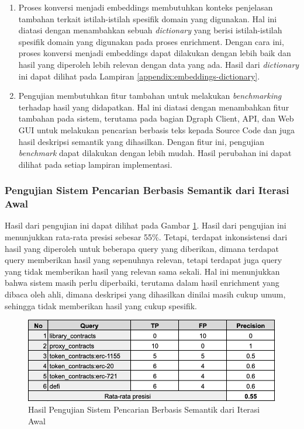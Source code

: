 \begin{enumerate}
	\item Proses konversi menjadi embeddings membutuhkan konteks penjelasan tambahan terkait istilah-istilah spesifik domain yang digunakan. Hal ini diatasi dengan menambahkan sebuah \textit{dictionary} yang berisi istilah-istilah spesifik domain yang digunakan pada proses enrichment. Dengan cara ini, proses konversi menjadi embeddings dapat dilakukan dengan lebih baik dan hasil yang diperoleh lebih relevan dengan data yang ada. Hasil dari \textit{dictionary} ini dapat dilihat pada Lampiran \ref{appendix:embeddings-dictionary}.
	\item Pengujian membutuhkan fitur tambahan untuk melakukan \textit{benchmarking} terhadap hasil yang didapatkan. Hal ini diatasi dengan menambahkan fitur tambahan pada sistem, terutama pada bagian Dgraph Client, API, dan Web GUI untuk melakukan pencarian berbasis teks kepada Source Code dan juga hasil deskripsi semantik yang dihasilkan. Dengan fitur ini, pengujian \textit{benchmark} dapat dilakukan dengan lebih mudah. Hasil perubahan ini dapat dilihat pada setiap lampiran implementasi.
\end{enumerate}

\subsubsection{Pengujian Sistem Pencarian Berbasis Semantik dari Iterasi Awal}

Hasil dari pengujian ini dapat dilihat pada Gambar \ref{image:pengujian-1}. Hasil dari pengujian ini menunjukkan rata-rata presisi sebesar 55\%. Tetapi, terdapat inkonsistensi dari hasil yang diperoleh untuk beberapa query yang diberikan, dimana terdapat query memberikan hasil yang sepenuhnya relevan, tetapi terdapat juga query yang tidak memberikan hasil yang relevan sama sekali. Hal ini menunjukkan bahwa sistem masih perlu diperbaiki, terutama dalam hasil enrichment yang dibaca oleh ahli, dimana deskripsi yang dihasilkan dinilai masih cukup umum, sehingga tidak memberikan hasil yang cukup spesifik.

\begin{figure}[ht]
	\centering
	\includegraphics[width=1\textwidth]{resources/chapter-4/data-1-1.png}
	\caption{Hasil Pengujian Sistem Pencarian Berbasis Semantik dari Iterasi Awal}
	\label{image:pengujian-1}
\end{figure}


